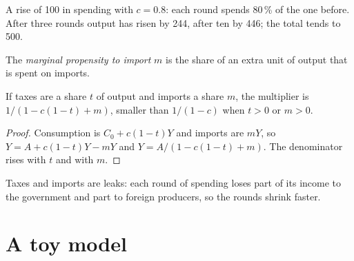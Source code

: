 \begin{omfigure}

{\small A rise of 100 in spending with $c = 0.8$: each round spends 80\,\% of the one before. After three rounds output has risen by 244, after ten by 446; the total
tends to 500.}
\end{omfigure}

\begin{definition}\label{def:g12:keynesian-cross:mpm}
The \emph{marginal propensity to import} $m$ is the share of an extra unit of output that is spent on imports.
\end{definition}

\begin{proposition}\label{prop:g12:keynesian-cross:leakages}
If taxes are a share $t$ of output and imports a share $m$, the multiplier is $1/(1 - c(1 - t) + m)$, smaller than $1/(1 - c)$ when $t > 0$ or $m > 0$.
\end{proposition}
\begin{proof}
Consumption is $C_0 + c(1 - t)Y$ and imports are $mY$, so $Y = A + c(1 - t)Y - mY$ and $Y = A/(1 - c(1 - t) + m)$. The denominator rises with $t$ and with $m$.
\end{proof}

Taxes and imports are leaks: each round of spending loses part of its income to the government and part to foreign producers, so the rounds shrink faster.

\section{A toy model}\label{sec:g12:keynesian-cross:toy}


